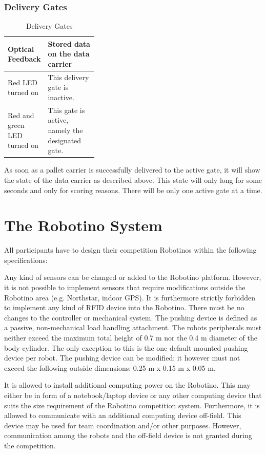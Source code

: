 \documentclass[12pt,twoside]{article}
\newenvironment{rulechange}{}{}
\newcommand{\Robotino}{Robotino\textregistered}
\begin{document}
\subsubsection{Delivery Gates} \begin{table}[h]
  \centering
  \begin{tabularx}{\linewidth}{p{0.35\linewidth}|X}
    \multicolumn{1}{l}{Optical Feedback} &\multicolumn{1}{l}{Stored
      data on the data carrier}\\\hline
    Red LED turned on & This delivery gate is inactive.\\
    Red and green LED turned on & This gate is active, namely the designated gate.\\
    \hline
  \end{tabularx}
  \caption{Delivery Gates}
  \label{tab:delivery-gates}
\end{table}

As soon as a pallet carrier is successfully delivered to the active
gate, it will show the state of the data carrier as described above.
This state will only long for some seconds and only for scoring
reasons. There will be only one active gate at a time.



\section{The Robotino System}

All participants have to design their competition Robotinos within
the following specifications:

Any kind of sensors can be changed or added to the Robotino platform.
However, it is not possible to implement sensors that require
modifications outside the Robotino area (e.g. Northstar, indoor GPS).
It is furthermore strictly forbidden to implement any kind of RFID
device into the Robotino. There must be no changes to the controller
or mechanical system. The pushing device is defined as a passive,
non-mechanical load handling attachment. The robots peripherals must
neither exceed the maximum total height of 0.7 m nor the 0.4 m
diameter of the body cylinder. The only exception to this is the one
default mounted pushing device per robot. The pushing device can be
modified; it however must not exceed the following outside dimensions:
0.25 m x 0.15 m x 0.05 m.

\begin{rulechange}
  It is allowed to install additional computing power on the
  \Robotino. This may either be in form of a notebook/laptop device or
  any other computing device that suits the size requirement of the
  \Robotino{} competition system. Furthermore, it is allowed to
  communicate with an additional computing device off-field. This
  device may be used for team coordination and/or other
  purposes. However, communication among the robots and the off-field
  device is not granted during the competition.
\end{rulechange}
\end{document}

